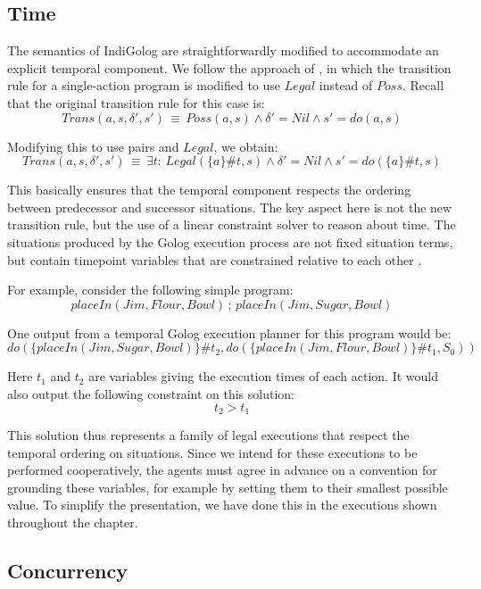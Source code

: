\subsection{Time}

The semantics of IndiGolog are straightforwardly modified to accommodate
an explicit temporal component. We follow the approach of \citep{Reiter98seq_temp_golog,reiter01kia},
in which the transition rule for a single-action program is modified
to use $Legal$ instead of $Poss$. Recall that the original transition
rule for this case is:\[
Trans(a,s,\delta',s')\,\equiv\, Poss(a,s)\wedge\delta'=Nil\wedge s'=do(a,s)\]


Modifying this to use  pairs and $Legal$,
we obtain:\begin{equation}
Trans(a,s,\delta',s')\,\equiv\,\exists t:\, Legal(\{a\}\#t,s)\wedge\delta'=Nil\wedge s'=do(\{a\}\#t,s)\label{eq:MIndiGolog:temp_trans_a}\end{equation}


This basically ensures that the temporal component respects the ordering
between predecessor and successor situations. The key aspect here
is not the new transition rule, but the use of a linear constraint
solver to reason about time. The situations produced by the Golog
execution process are not fixed situation terms, but contain timepoint
variables that are constrained relative to each other \citep{Reiter98seq_temp_golog}.

For example, consider the following simple program:\[
placeIn(Jim,Flour,Bowl)\,;\, placeIn(Jim,Sugar,Bowl)\]


One output from a temporal Golog execution planner for this program
would be:\[
do(\{placeIn(Jim,Sugar,Bowl)\}\#t_{2},do(\{placeIn(Jim,Flour,Bowl)\}\#t_{1},S_{0}))\]


Here $t_{1}$ and $t_{2}$ are variables giving the execution times
of each action. It would also output the following constraint on this
solution:\[
t_{2}>t_{1}\]


This solution thus represents a family of legal executions that respect
the temporal ordering on situations. Since we intend for these executions
to be performed cooperatively, the agents must agree in advance on
a convention for grounding these variables, for example by setting
them to their smallest possible value. To simplify the presentation,
we have done this in the executions shown throughout the chapter.


\subsection{Concurrency}

